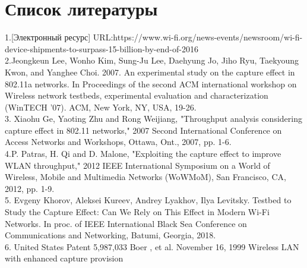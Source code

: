 \documentclass{llncs}
\begin{document}
\section{Список литературы}

%
1.[Электронный ресурс]  URL:https://www.wi-fi.org/news-events/newsroom/wi-fi-device-shipments-to-surpass-15-billion-by-end-of-2016
\\
2.Jeongkeun Lee, Wonho Kim, Sung-Ju Lee, Daehyung Jo, Jiho Ryu, Taekyoung Kwon, and Yanghee Choi. 2007. An experimental study on the capture effect in 802.11a networks. In Proceedings of the second ACM international workshop on Wireless network testbeds, experimental evaluation and characterization (WinTECH '07). ACM, New York, NY, USA, 19-26.
\\
3. Xiaohu Ge, Yaoting Zhu and Rong Weijiang, "Throughput analysis considering capture effect in 802.11 networks," 2007 Second International Conference on Access Networks and Workshops, Ottawa, Ont., 2007, pp. 1-6.
\\
4.P. Patras, H. Qi and D. Malone, "Exploiting the capture effect to improve WLAN throughput," 2012 IEEE International Symposium on a World of Wireless, Mobile and Multimedia Networks (WoWMoM), San Francisco, CA, 2012, pp. 1-9.
\\
5. Evgeny Khorov, Aleksei Kureev, Andrey Lyakhov, Ilya Levitsky. Testbed to Study the Capture Effect: Can We Rely on This Effect in Modern Wi-Fi Networks. In proc. of IEEE International Black Sea Conference on Communications and Networking, Batumi, Georgia, 2018.
\\
6. United States Patent 5,987,033
Boer , et al. November 16, 1999
Wireless LAN with enhanced capture provision 





%
\end{document}
